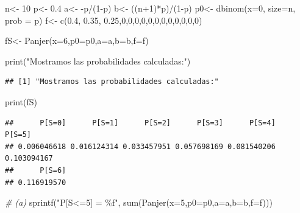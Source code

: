 \documentclass[
]{article}
\newenvironment{Shaded}{\begin{snugshade}}{\end{snugshade}}
\newcommand{\AttributeTok}[1]{\textcolor[rgb]{0.77,0.63,0.00}{#1}}
\newcommand{\CommentTok}[1]{\textcolor[rgb]{0.56,0.35,0.01}{\textit{#1}}}
\newcommand{\DecValTok}[1]{\textcolor[rgb]{0.00,0.00,0.81}{#1}}
\newcommand{\FloatTok}[1]{\textcolor[rgb]{0.00,0.00,0.81}{#1}}
\newcommand{\FunctionTok}[1]{\textcolor[rgb]{0.00,0.00,0.00}{#1}}
\newcommand{\NormalTok}[1]{#1}
\newcommand{\OtherTok}[1]{\textcolor[rgb]{0.56,0.35,0.01}{#1}}
\newcommand{\SpecialCharTok}[1]{\textcolor[rgb]{0.00,0.00,0.00}{#1}}
\newcommand{\StringTok}[1]{\textcolor[rgb]{0.31,0.60,0.02}{#1}}
\begin{document}
\begin{Shaded}
\begin{Highlighting}[]
\NormalTok{n}\OtherTok{\textless{}{-}} \DecValTok{10}
\NormalTok{p}\OtherTok{\textless{}{-}} \FloatTok{0.4}
\NormalTok{a}\OtherTok{\textless{}{-}} \SpecialCharTok{{-}}\NormalTok{p}\SpecialCharTok{/}\NormalTok{(}\DecValTok{1}\SpecialCharTok{{-}}\NormalTok{p)}
\NormalTok{b}\OtherTok{\textless{}{-}}\NormalTok{ ((n}\SpecialCharTok{+}\DecValTok{1}\NormalTok{)}\SpecialCharTok{*}\NormalTok{p)}\SpecialCharTok{/}\NormalTok{(}\DecValTok{1}\SpecialCharTok{{-}}\NormalTok{p)}
\NormalTok{p0}\OtherTok{\textless{}{-}} \FunctionTok{dbinom}\NormalTok{(}\AttributeTok{x=}\DecValTok{0}\NormalTok{, }\AttributeTok{size=}\NormalTok{n, }\AttributeTok{prob =}\NormalTok{ p)}
\NormalTok{f}\OtherTok{\textless{}{-}} \FunctionTok{c}\NormalTok{(}\FloatTok{0.4}\NormalTok{, }\FloatTok{0.35}\NormalTok{, }\FloatTok{0.25}\NormalTok{,}\DecValTok{0}\NormalTok{,}\DecValTok{0}\NormalTok{,}\DecValTok{0}\NormalTok{,}\DecValTok{0}\NormalTok{,}\DecValTok{0}\NormalTok{,}\DecValTok{0}\NormalTok{,}\DecValTok{0}\NormalTok{,}\DecValTok{0}\NormalTok{,}\DecValTok{0}\NormalTok{,}\DecValTok{0}\NormalTok{,}\DecValTok{0}\NormalTok{,}\DecValTok{0}\NormalTok{)}

\NormalTok{fS}\OtherTok{\textless{}{-}} \FunctionTok{Panjer}\NormalTok{(}\AttributeTok{x=}\DecValTok{6}\NormalTok{,}\AttributeTok{p0=}\NormalTok{p0,}\AttributeTok{a=}\NormalTok{a,}\AttributeTok{b=}\NormalTok{b,}\AttributeTok{f=}\NormalTok{f)}

\FunctionTok{print}\NormalTok{(}\StringTok{"Mostramos las probabilidades calculadas:"}\NormalTok{)}
\end{Highlighting}
\end{Shaded}

\begin{verbatim}
## [1] "Mostramos las probabilidades calculadas:"
\end{verbatim}

\begin{Shaded}
\begin{Highlighting}[]
\FunctionTok{print}\NormalTok{(fS)}
\end{Highlighting}
\end{Shaded}

\begin{verbatim}
##      P[S=0]      P[S=1]      P[S=2]      P[S=3]      P[S=4]      P[S=5] 
## 0.006046618 0.016124314 0.033457951 0.057698169 0.081540206 0.103094167 
##      P[S=6] 
## 0.116919570
\end{verbatim}

\begin{Shaded}
\begin{Highlighting}[]
\CommentTok{\# (a)}
\FunctionTok{sprintf}\NormalTok{(}\StringTok{"P[S\textless{}=5] = \%f"}\NormalTok{, }\FunctionTok{sum}\NormalTok{(}\FunctionTok{Panjer}\NormalTok{(}\AttributeTok{x=}\DecValTok{5}\NormalTok{,}\AttributeTok{p0=}\NormalTok{p0,}\AttributeTok{a=}\NormalTok{a,}\AttributeTok{b=}\NormalTok{b,}\AttributeTok{f=}\NormalTok{f)))}
\end{Highlighting}
\end{Shaded}
\end{document}
